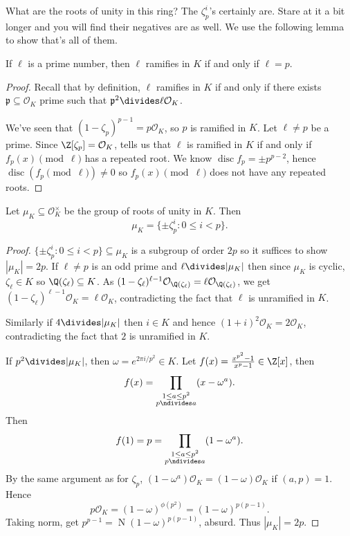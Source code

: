 \documentclass[a4paper]{article}
\renewcommand*{\O}{\mathcal{O}}
\DeclareMathOperator{\n}{N}
\DeclareMathOperator{\disc}{disc}
\begin{document}
What are the roots of unity in this ring? The \(\zeta_p^i\)'s certainly are. Stare at it a bit longer and you will find their negatives are as well. We use the following lemma to show that's all of them.

\begin{lemma}
  If \(\ell\) is a prime number, then \(\ell\) ramifies in \(K\) if and only if \(\ell = p\).
\end{lemma}

\begin{proof}
  Recall that by definition, \(\ell\) ramifies in \(K\) if and only if there exists \(\mathfrak p \subseteq \O_K\) prime such that \(\mathfrak p^2 \divides \ell \O_K\).

  We've seen that \((1 - \zeta_p)^{p - 1} = p\O_K\), so \(p\) is ramified in \(K\). Let \(\ell \neq p\) be a prime. Since \(\Z[\zeta_p] = \O_K\),  tells us that \(\ell\) is ramified in \(K\) if and only if \(f_p(x) \pmod \ell\) has a repeated root. We know \(\disc f_p = \pm p^{p - 2}\), hence \(\disc(f_p \pmod \ell) \neq 0\) so \(f_p(x) \pmod \ell\) does not have any repeated roots.
\end{proof}

\begin{proposition}
  Let \(\mu_K \subseteq \O_K^\times\) be the group of roots of unity in \(K\). Then
  \[
    \mu_K = \{\pm \zeta_p^i: 0 \leq i < p\}.
  \]
\end{proposition}

\begin{proof}
  \(\{\pm \zeta_p^i: 0 \leq i < p\} \subseteq \mu_K\) is a subgroup of order \(2p\) so it suffices to show \(|\mu_K| = 2p\). If \(\ell \neq p\) is an odd prime and \(\ell \divides |\mu_K|\) then since \(\mu_K\) is cyclic, \(\zeta_\ell \in K\) so \(\Q(\zeta_\ell) \subseteq K\). As \((1 - \zeta_\ell)^{\ell - 1} \O_{\Q(\zeta_\ell)} = \ell \O_{\Q(\zeta_\ell)}\), we get \((1 - \zeta_\ell)^{\ell - 1} \O_K = \ell \O_K\), contradicting the fact that \(\ell\) is unramified in \(K\).

  Similarly if \(4 \divides |\mu_K|\) then \(i \in K\) and hence \((1 + i)^2 \O_K = 2\O_K\), contradicting the fact that \(2\) is unramified in \(K\).

  If \(p^2 \divides |\mu_K|\), then \(\omega = e^{2\pi i/p^2} \in K\). Let \(f(x) = \frac{x^{p^2} - 1}{x^p - 1} \in \Z[x]\), then
  \[
    f(x) = \prod_{\substack{1 \leq a \leq p^2 \\ p \ndivides a}} (x - \omega^a).
  \]
  Then
  \[
    f(1) = p = \prod_{\substack{1 \leq a \leq p^2 \\ p \ndivides a}} (1 - \omega^a).
  \]
  By the same argument as for \(\zeta_p\), \((1 - \omega^a) \O_K = (1 - \omega) \O_K\) if \((a, p) = 1\). Hence
  \[
    p \O_K = (1 - \omega)^{\phi(p^2)} = (1 - \omega)^{p(p - 1)}.
  \]
  Taking norm, get \(p^{p - 1} = \n(1 - \omega)^{p(p - 1)}\), absurd. Thus \(|\mu_K| = 2p\).
\end{proof}
\end{document}
